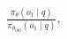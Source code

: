 \documentclass[preview]{standalone}
\begin{document}
\begin{align*}
\frac{\pi_\theta(o_1 \mid q)}{\pi_{\theta_{\text{old}}}(o_1 \mid q)},
\end{align*}
\end{document}
